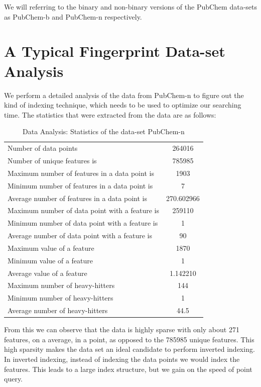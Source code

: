 We will referring to the binary and non-binary versions of the PubChem data-sets as PubChem-b and PubChem-n respectively.



\section{A Typical Fingerprint Data-set Analysis}
We perform a detailed analysis of the data from  PubChem-n to figure out the kind of indexing technique, which needs to be used to optimize our searching time. The statistics that were extracted from the data are as follows:\\

\begin{table}[ht!]
\centering
\caption{Data Analysis: Statistics of the data-set PubChem-n}
\begin{tabular}{|l|c|}
\hline 
Number of data points & 264016 \\ 
Number of unique features is & 785985 \\ 
Maximum number of features in a data point is & 1903 \\ 
Minimum number of features in a data point is  & 7 \\ 
Average number of features in a data point is & 270.602966 \\ 
Maximum number of data point with a feature is & 259110 \\ 
Minimum number of data point with a feature is & 1 \\ 
Average number of data point with a feature is & 90
 \\ 
Maximum value of a feature  & 1870 \\ 
Minimum value of a feature
 & 1 \\ 
Average value of a feature & 1.142210 \\ 
Maximum number of heavy-hitters  & 144 \\ 
Minimum number of heavy-hitters  & 1 \\ 
 Average number of heavy-hitters  & 44.5 \\ 
\hline 
\end{tabular} 
\end{table}

From this we can observe that the data is highly sparse with only about 271 features, on a average, in a point, as opposed to the 785985 unique features. This high sparsity makes the data set an ideal candidate to perform inverted indexing. In inverted indexing, instead of indexing the data points we would index the features. This leads to a large index structure, but we gain on the speed of point query. \\

